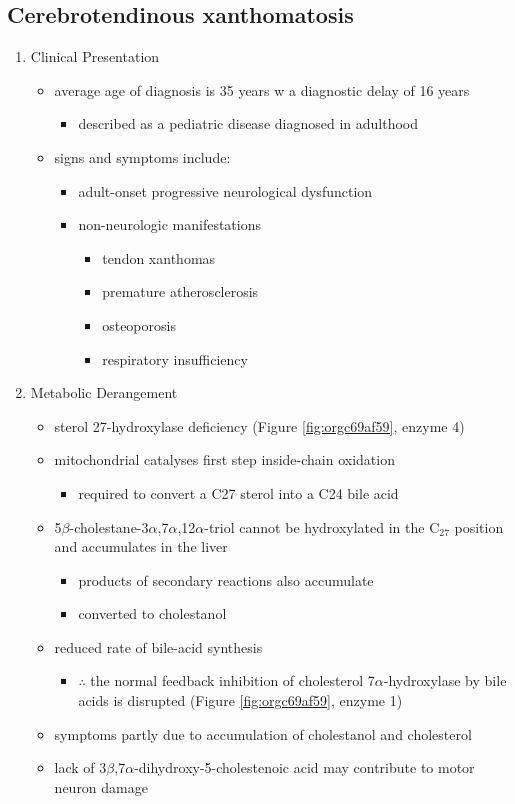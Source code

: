 \documentclass{scrartcl}
\begin{document}
\subsection{Cerebrotendinous xanthomatosis}
\label{sec:org1d973bf}
\begin{enumerate}
\item Clinical Presentation
\label{sec:org7ff10e1}
\begin{itemize}
\item average age of diagnosis is 35 years w a diagnostic delay of 16 years
\begin{itemize}
\item described as a pediatric disease diagnosed in adulthood
\end{itemize}
\item signs and symptoms include:
\begin{itemize}
\item adult-onset progressive neurological dysfunction
\item non-neurologic manifestations
\begin{itemize}
\item tendon xanthomas
\item premature atherosclerosis
\item osteoporosis
\item respiratory insufficiency
\end{itemize}
\end{itemize}
\end{itemize}

\item Metabolic Derangement
\label{sec:org795e796}
\begin{itemize}
\item sterol 27-hydroxylase deficiency (Figure \ref{fig:orgc69af59}, enzyme 4)
\item mitochondrial catalyses first step inside-chain oxidation
\begin{itemize}
\item required to convert a C27 sterol into a C24 bile acid
\end{itemize}
\item 5\(\beta\)-cholestane-3\(\alpha\),7\(\alpha\),12\(\alpha\)-triol cannot be hydroxylated in the C\(_{\text{27}}\)
position and accumulates in the liver
\begin{itemize}
\item products of secondary reactions also accumulate
\item converted to cholestanol
\end{itemize}
\item reduced rate of bile-acid synthesis
\begin{itemize}
\item \(\therefore\) the normal feedback inhibition of cholesterol
7\(\alpha\)-hydroxylase by bile acids is disrupted (Figure \ref{fig:orgc69af59}, enzyme 1)
\end{itemize}
\item symptoms partly due to accumulation of cholestanol and cholesterol
\item lack of 3\(\beta\),7\(\alpha\)-dihydroxy-5-cholestenoic acid may contribute to motor
neuron damage
\end{itemize}


\end{enumerate}
\end{document}
